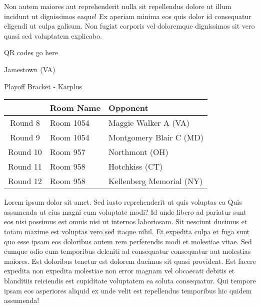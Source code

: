 \documentclass{article}%
\begin{document}
\newline%
Non autem maiores aut reprehenderit nulla sit repellendus dolore ut illum incidunt ut dignissimos eaque! Ex aperiam minima eos quis dolor id consequatur eligendi ut culpa galisum. Non fugiat corporis vel doloremque dignissimos sit vero quasi sed voluptatem explicabo.\newline%
\newline%
%
\vspace*{30pt}%
\begin{center}%
\begin{Huge}%
QR codes go here%
\end{Huge}%
\end{center}%
\newpage%
\begin{center}%
\begin{Huge}%
Jamestown (VA)%
\end{Huge}%
\vspace*{8pt}%
\linebreak%
\begin{Large}%
Playoff Bracket {-} Karplus%
\end{Large}%
\end{center}%
\begin{tabularx}{\textwidth}{|c|Y|Y|}%
\hline%
&Room Name&Opponent\\%
\hline%
Round 8&Room 1054&Maggie Walker A (VA)\\%
Round 9&Room 1054&Montgomery Blair C (MD)\\%
Round 10&Room 957&Northmont (OH)\\%
Round 11&Room 958&Hotchkiss (CT)\\%
Round 12&Room 958&Kellenberg Memorial (NY)\\%
\hline%
\end{tabularx}%
\vspace*{8pt}%
\linebreak%
\newline%
\newline%
Lorem ipsum dolor sit amet. Sed iusto reprehenderit ut quis voluptas ea Quis assumenda ut eius magni eum voluptate modi? Id unde libero ad pariatur sunt eos nisi possimus est omnis nisi ut internos laboriosam. Sit nesciunt ducimus et totam maxime est voluptas vero sed itaque nihil. Et expedita culpa et fuga sunt quo esse ipsam eos doloribus autem rem perferendis modi et molestiae vitae.\newline%
\newline%
Sed cumque odio eum temporibus deleniti ad consequatur consequatur aut molestias maiores. Est doloribus tenetur est dolorem ducimus sit quasi provident. Est facere expedita non expedita molestiae non error magnam vel obcaecati debitis et blanditiis reiciendis est cupiditate voluptatem ea soluta consequatur. Qui tempore ipsam eos asperiores aliquid ex unde velit est repellendus temporibus hic quidem assumenda!\newline%
\end{document}
